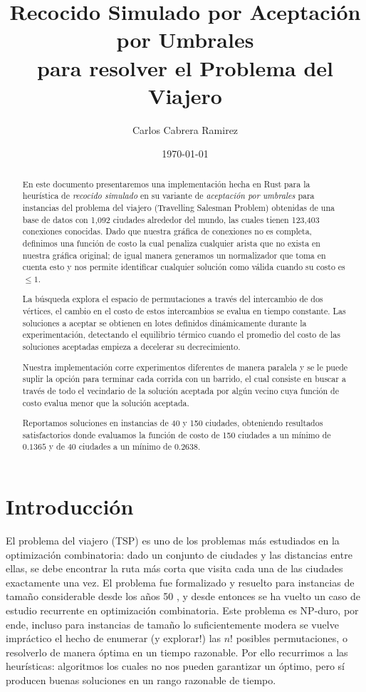 \documentclass[11pt,letterpaper]{article}
\title{Recocido Simulado por Aceptación por Umbrales \\
       para resolver el Problema del Viajero}
\author{Carlos Cabrera Ramirez}
\date{\today}
\begin{document}
\maketitle

\begin{abstract}
En este documento presentaremos una implementación hecha en Rust para la heurística de \emph{recocido simulado} en su variante de \emph{aceptación por umbrales} para instancias del problema del viajero (Travelling Salesman Problem) obtenidas de una base de datos con 1,092 ciudades alrededor del mundo, las cuales tienen 123,403 conexiones conocidas. Dado que nuestra gráfica de conexiones no es completa, definimos una función de costo la cual penaliza cualquier arista que no exista en nuestra gráfica original; de igual manera generamos un normalizador que toma en cuenta esto y nos permite identificar cualquier solución como válida cuando su costo es $\leq 1$.

La búsqueda explora el espacio de permutaciones a través del intercambio de dos vértices, el cambio en el costo de estos intercambios se evalua en tiempo constante. Las soluciones a aceptar se obtienen en lotes definidos dinámicamente durante la experimentación, detectando el equilibrio térmico cuando el promedio del costo de las soluciones aceptadas empieza a decelerar su decrecimiento.

Nuestra implementación corre experimentos diferentes de manera paralela y se le puede suplir la opción para terminar cada corrida con un barrido, el cual consiste en buscar a través de todo el vecindario de la solución aceptada por algún vecino cuya función de costo evalua menor que la solución aceptada.

Reportamos soluciones en instancias de 40 y 150 ciudades, obteniendo resultados satisfactorios donde evaluamos la función de costo de 150 ciudades a un mínimo de $0.1365$ y de 40 ciudades a un mínimo de $0.2638$.
\end{abstract}

\section{Introducción}
El problema del viajero (TSP) es uno de los problemas más estudiados en la optimización combinatoria: dado un conjunto de ciudades y las distancias entre ellas, se debe encontrar la ruta más corta que visita cada una de las ciudades exactamente una vez. El problema fue formalizado y resuelto para instancias de tamaño considerable desde los años 50 \cite{dantzig1954}, y desde entonces se ha vuelto un caso de estudio recurrente en optimización combinatoria. Este problema es NP-duro, por ende, incluso para instancias de tamaño lo suficientemente modera se vuelve impráctico el hecho de enumerar (y explorar!) las $n!$ posibles permutaciones, o resolverlo de manera óptima en un tiempo razonable. Por ello recurrimos a las heurísticas: algoritmos los cuales no nos pueden garantizar un óptimo, pero sí producen buenas soluciones en un rango razonable de tiempo.
\end{document}
